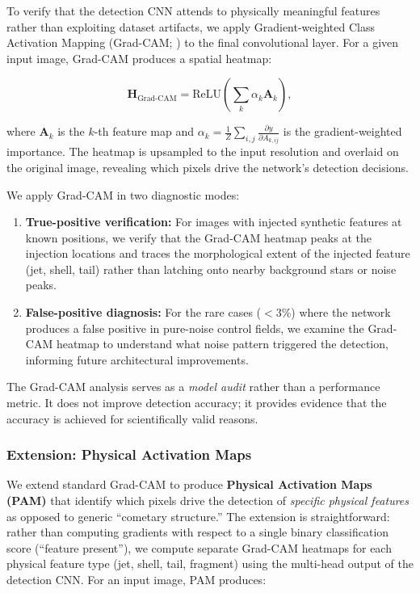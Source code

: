 \documentclass[usenatbib]{mnras}
\begin{document}
To verify that the detection CNN attends to physically meaningful features rather than exploiting dataset artifacts, we apply Gradient-weighted Class Activation Mapping (Grad-CAM; \citealt{selvaraju17}) to the final convolutional layer. For a given input image, Grad-CAM produces a spatial heatmap:

\begin{equation}\label{eq:gradcam}
\mathbf{H}_{\text{Grad-CAM}} = \text{ReLU}\left(\sum_k \alpha_k \mathbf{A}_k\right),
\end{equation}

where $\mathbf{A}_k$ is the $k$-th feature map and $\alpha_k = \frac{1}{Z}\sum_{i,j}\frac{\partial y}{\partial A_{k,ij}}$ is the gradient-weighted importance. The heatmap is upsampled to the input resolution and overlaid on the original image, revealing which pixels drive the network's detection decisions.

We apply Grad-CAM in two diagnostic modes:

\begin{enumerate}
    \item \textbf{True-positive verification:} For images with injected synthetic features at known positions, we verify that the Grad-CAM heatmap peaks at the injection locations and traces the morphological extent of the injected feature (jet, shell, tail) rather than latching onto nearby background stars or noise peaks.
    \item \textbf{False-positive diagnosis:} For the rare cases ($<3\%$) where the network produces a false positive in pure-noise control fields, we examine the Grad-CAM heatmap to understand what noise pattern triggered the detection, informing future architectural improvements.
\end{enumerate}

The Grad-CAM analysis serves as a \textit{model audit} rather than a performance metric. It does not improve detection accuracy; it provides evidence that the accuracy is achieved for scientifically valid reasons.

\subsubsection{Extension: Physical Activation Maps}

We extend standard Grad-CAM to produce \textbf{Physical Activation Maps (PAM)} that identify which pixels drive the detection of \textit{specific physical features} as opposed to generic ``cometary structure.'' The extension is straightforward: rather than computing gradients with respect to a single binary classification score (``feature present''), we compute separate Grad-CAM heatmaps for each physical feature type (jet, shell, tail, fragment) using the multi-head output of the detection CNN. For an input image, PAM produces:
\end{document}
